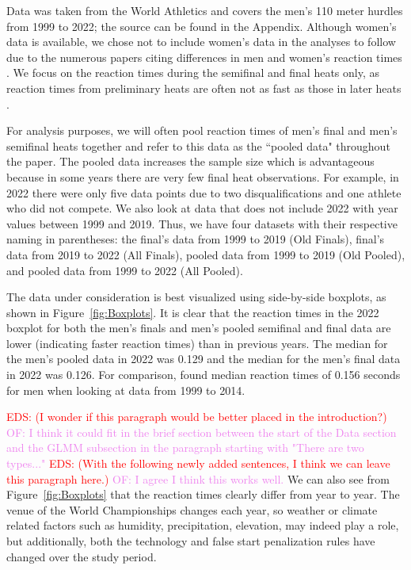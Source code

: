 \documentclass[12pt, letterpaper, titlepage]{article}
\newcommand{\eds}[1]{\textcolor{red}{EDS: (#1)}}
\newcommand{\of}[1]{\textcolor{violet}{OF: #1}}
\begin{document}
Data was taken from the World Athletics 
and covers the men's 110 meter hurdles from 1999 to 2022; the source can be 
found in the Appendix.
Although women's data is available, we chose not to include women's data in the
analyses to follow due to the numerous papers citing differences in men and
women's reaction times \citep[e.g.,][]{lipps2011implications, 
babicc2009reaction, panoutsakopoulos2020gender}.
We focus on the reaction times during the semifinal and final heats only, as 
reaction times from preliminary heats are often not as fast as those in later 
heats \citep[e.g.,][]{zhang2021correlation}. 

For analysis purposes, we will often pool reaction times of men's final and 
men's semifinal heats together and refer to this data as the ``pooled data"
throughout the paper. 
The pooled data increases the sample size which is advantageous because in some
years there are very few final heat observations.  For example, in 2022 there
were only five data points due to two disqualifications and one athlete who 
did not compete.  We also look at data that does not include 2022 with year values
between 1999 and 2019.  Thus, we have four datasets with their respective naming
in parentheses: the final's data from 1999 to 2019 (Old Finals), final's data 
from 2019 to 2022 (All Finals), pooled data from 1999 to 2019 (Old Pooled), and 
pooled data from 1999 to 2022 (All Pooled).

The data under consideration is best visualized using side-by-side boxplots, as
shown in Figure~\ref{fig:Boxplots}.  It is clear that the reaction times in the 
2022 boxplot for both 
the men's finals and men's pooled semifinal and final data are lower (indicating 
faster reaction times)
than in previous years.  The median for the men's pooled data in 2022 was 0.129
and the median for the men's final data in 2022 was 0.126.  For comparison,
\citet{brosnan2017effects} found median reaction times of 0.156 seconds 
for men when looking at data from 1999 to 2014.


\eds{I wonder if this paragraph would be better placed in the introduction?}
\of{I think it could fit in the brief section between the start of the Data section
and the GLMM subsection in the paragraph starting with "There are two types..."}
\eds{With the following newly added sentences, I think we can leave this paragraph here.}
\of{I agree I think this works well.}
We can also see from Figure~\ref{fig:Boxplots} that the reaction times clearly
differ from year to year. The venue of the World Championships changes each 
year, so weather or climate related factors such as humidity, precipitation, 
elevation, may indeed play a role, but additionally, both the technology and 
false start penalization rules have changed over the study period.
\end{document}
